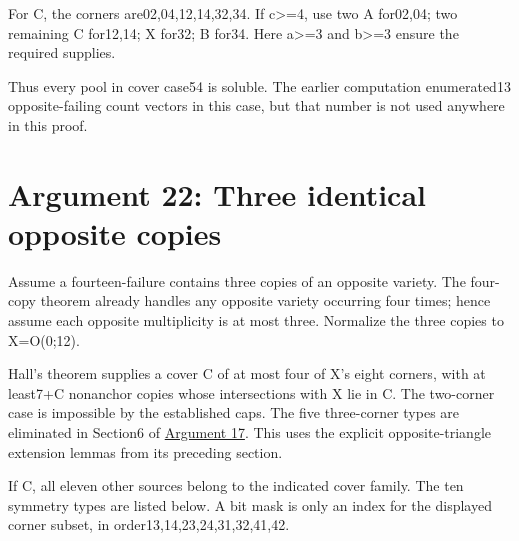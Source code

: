 \documentclass[
  10pt,
]{article}
\begin{document}
For C, the corners are02,04,12,14,32,34. If c\textgreater=4, use two A
for02,04; two remaining C for12,14; X for32; B for34. Here
a\textgreater=3 and b\textgreater=3 ensure the required supplies.

Thus every pool in cover case54 is soluble. The earlier computation
enumerated13 opposite-failing count vectors in this case, but that
number is not used anywhere in this proof.

\hypertarget{arg-22}{%
\section{Argument 22: Three identical opposite copies}\label{arg-22}}

Assume a fourteen-failure contains three copies of an opposite variety.
The four-copy theorem already handles any opposite variety occurring
four times; hence assume each opposite multiplicity is at most three.
Normalize the three copies to X=O(0;12).

Hall's theorem supplies a cover C of at most four of X's eight corners,
with at least7+\textbar C\textbar{} nonanchor copies whose intersections
with X lie in C. The two-corner case is impossible by the established
caps. The five three-corner types are eliminated in Section6 of
\protect\hyperlink{arg-17}{Argument 17}. This uses the explicit
opposite-triangle extension lemmas from its preceding section.

If \textbar C, all eleven other sources belong to the
indicated cover family. The ten symmetry types are listed below. A bit
mask is only an index for the displayed corner subset, in
order13,14,23,24,31,32,41,42.
\end{document}
